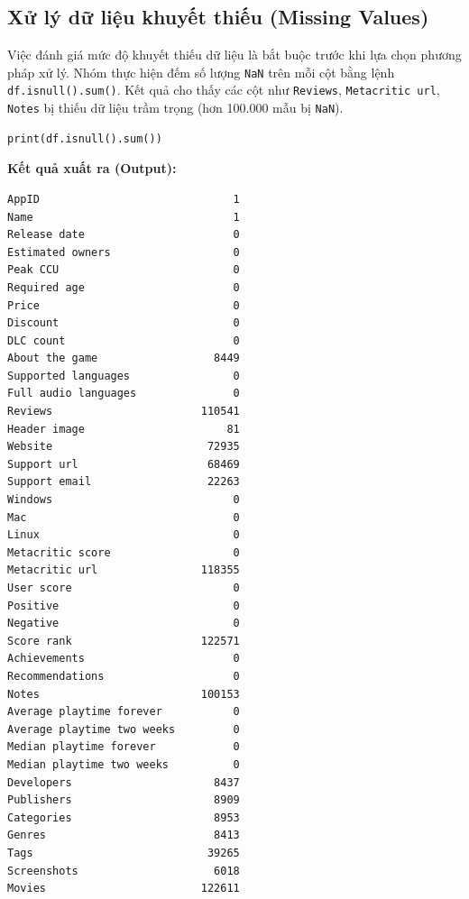 \subsection{Xử lý dữ liệu khuyết thiếu (Missing Values)}
\hspace{1cm} Việc đánh giá mức độ khuyết thiếu dữ liệu là bắt buộc trước khi lựa chọn phương pháp xử lý. Nhóm thực hiện đếm số lượng \texttt{NaN} trên mỗi cột bằng lệnh \texttt{df.isnull().sum()}. Kết quả cho thấy các cột như \texttt{Reviews}, \texttt{Metacritic url}, \texttt{Notes} bị thiếu dữ liệu trầm trọng (hơn 100.000 mẫu bị \texttt{NaN}).
\begin{verbatim}
print(df.isnull().sum())
\end{verbatim}

\textbf{Kết quả xuất ra (Output):}
\begin{verbatim}
AppID                              1
Name                               1
Release date                       0
Estimated owners                   0
Peak CCU                           0
Required age                       0
Price                              0
Discount                           0
DLC count                          0
About the game                  8449
Supported languages                0
Full audio languages               0
Reviews                       110541
Header image                      81
Website                        72935
Support url                    68469
Support email                  22263
Windows                            0
Mac                                0
Linux                              0
Metacritic score                   0
Metacritic url                118355
User score                         0
Positive                           0
Negative                           0
Score rank                    122571
Achievements                       0
Recommendations                    0
Notes                         100153
Average playtime forever           0
Average playtime two weeks         0
Median playtime forever            0
Median playtime two weeks          0
Developers                      8437
Publishers                      8909
Categories                      8953
Genres                          8413
Tags                           39265
Screenshots                     6018
Movies                        122611
\end{verbatim}

